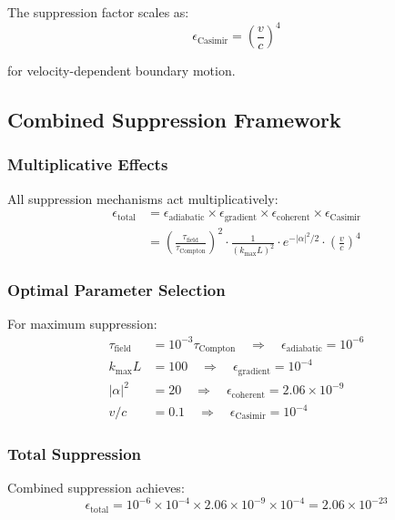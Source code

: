 The suppression factor scales as:
\begin{equation}
\epsilon_{\text{Casimir}} = \left(\frac{v}{c}\right)^4
\end{equation}

for velocity-dependent boundary motion.

\subsection{Combined Suppression Framework}

\subsubsection{Multiplicative Effects}

All suppression mechanisms act multiplicatively:
\begin{align}
\epsilon_{\text{total}} &= \epsilon_{\text{adiabatic}} \times \epsilon_{\text{gradient}} \times \epsilon_{\text{coherent}} \times \epsilon_{\text{Casimir}} \\
&= \left(\frac{\tau_{\text{field}}}{\tau_{\text{Compton}}}\right)^2 \cdot \frac{1}{(k_{\max}L)^2} \cdot e^{-|\alpha|^2/2} \cdot \left(\frac{v}{c}\right)^4
\end{align}

\subsubsection{Optimal Parameter Selection}

For maximum suppression:
\begin{align}
\tau_{\text{field}} &= 10^{-3} \tau_{\text{Compton}} \quad \Rightarrow \quad \epsilon_{\text{adiabatic}} = 10^{-6} \\
k_{\max}L &= 100 \quad \Rightarrow \quad \epsilon_{\text{gradient}} = 10^{-4} \\
|\alpha|^2 &= 20 \quad \Rightarrow \quad \epsilon_{\text{coherent}} = 2.06 \times 10^{-9} \\
v/c &= 0.1 \quad \Rightarrow \quad \epsilon_{\text{Casimir}} = 10^{-4}
\end{align}

\subsubsection{Total Suppression}

Combined suppression achieves:
\begin{equation}
\epsilon_{\text{total}} = 10^{-6} \times 10^{-4} \times 2.06 \times 10^{-9} \times 10^{-4} = 2.06 \times 10^{-23}
\end{equation}

